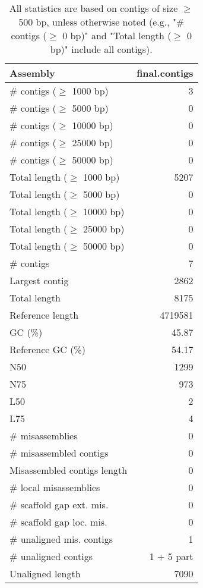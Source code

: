 \documentclass[12pt,a4paper]{article}
\begin{document}
\begin{table}[ht]
\begin{center}
\caption{All statistics are based on contigs of size $\geq$ 500 bp, unless otherwise noted (e.g., "\# contigs ($\geq$ 0 bp)" and "Total length ($\geq$ 0 bp)" include all contigs).}
\begin{tabular}{|l*{1}{|r}|}
\hline
Assembly & final.contigs \\ \hline
\# contigs ($\geq$ 1000 bp) & 3 \\ \hline
\# contigs ($\geq$ 5000 bp) & 0 \\ \hline
\# contigs ($\geq$ 10000 bp) & 0 \\ \hline
\# contigs ($\geq$ 25000 bp) & 0 \\ \hline
\# contigs ($\geq$ 50000 bp) & 0 \\ \hline
Total length ($\geq$ 1000 bp) & 5207 \\ \hline
Total length ($\geq$ 5000 bp) & 0 \\ \hline
Total length ($\geq$ 10000 bp) & 0 \\ \hline
Total length ($\geq$ 25000 bp) & 0 \\ \hline
Total length ($\geq$ 50000 bp) & 0 \\ \hline
\# contigs & 7 \\ \hline
Largest contig & 2862 \\ \hline
Total length & 8175 \\ \hline
Reference length & 4719581 \\ \hline
GC (\%) & 45.87 \\ \hline
Reference GC (\%) & 54.17 \\ \hline
N50 & 1299 \\ \hline
N75 & 973 \\ \hline
L50 & 2 \\ \hline
L75 & 4 \\ \hline
\# misassemblies & 0 \\ \hline
\# misassembled contigs & 0 \\ \hline
Misassembled contigs length & 0 \\ \hline
\# local misassemblies & 0 \\ \hline
\# scaffold gap ext. mis. & 0 \\ \hline
\# scaffold gap loc. mis. & 0 \\ \hline
\# unaligned mis. contigs & 1 \\ \hline
\# unaligned contigs & 1 + 5 part \\ \hline
Unaligned length & 7090 \\ \hline

\end{tabular}
\end{center}
\end{table}
\end{document}
